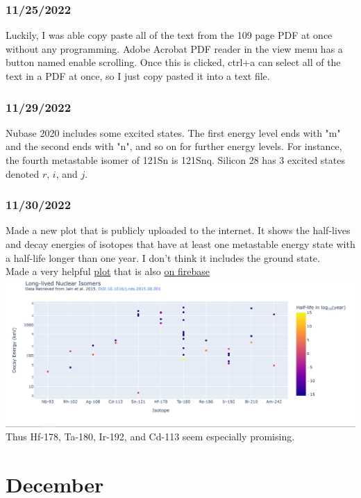 \documentclass[12pt]{article}
\begin{document}
\subsubsection{11/25/2022}
Luckily, I was able copy paste all of the text from the 109 page PDF at once without any programming. Adobe Acrobat PDF reader in the view menu has a button named enable scrolling. Once this is clicked, ctrl+a can select all of the text in a PDF at once, so I just copy pasted it into a text file. 
\subsubsection{11/29/2022}
Nubase 2020 includes some excited states. The first energy level ends with "m" and the second ends with "n", and so on for further energy levels. For instance, the fourth metastable isomer of 121Sn is 121Snq. Silicon 28 has 3 excited states denoted $r$, $i$, and $j$. 
\subsubsection{11/30/2022}
Made a new plot that is publicly uploaded to the internet. It shows the half-lives and decay energies of isotopes that have at least one metastable energy state with a half-life longer than one year. I don't think it includes the ground state. \\
Made a very helpful \href{https://marcosp7635.github.io/plots/Long_Lived_Isomers.html}{plot} that is also \href{https://mp7635plots.web.app/Long_Lived_Isomers.html}{on firebase}\\
\includegraphics[scale=.65]{Images/helpful_plot.PNG}\\
Thus Hf-178, Ta-180, Ir-192, and Cd-113 seem especially promising.
\section{December}
\end{document}
